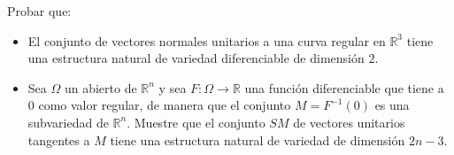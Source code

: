 \documentclass[11pt]{article}
\title{\paint{purple}{Geometr\'ia Diferencial}}
\author{\paint{purple}{Guido Arnone}}
\date{}
\newcommand{\R}{\mathbb{R}}
\newcommand{\paint}[2]{\color{#1}{#2}}
\newenvironment{exercise}[2][Ejercicio]{\begin{trivlist}
\item[\hskip \labelsep \paint{purple}{{\bfseries #1}}\hskip \labelsep {\bfseries #2.}]}{\end{trivlist}}
\begin{document}
\maketitle
\begin{exercise}{4} Probar que:
\begin{itemize}
\item[(a)] El conjunto de vectores normales unitarios a una curva regular en $\R^3$ tiene una estructura natural de variedad diferenciable de dimensión $2$.
\item[(b)] Sea $\Omega$ un abierto de $\R^n$ y sea $F : \Omega \to \R$ una función diferenciable que tiene a $0$ como valor regular, de manera que el conjunto $M = F^{-1}(0)$ es una subvariedad
de $\R^n$. Muestre que el conjunto $SM$ de vectores unitarios tangentes a $M$ tiene una estructura natural de variedad de dimensi\'on $2n - 3$.
\end{itemize}
\end{exercise}
\end{document}

